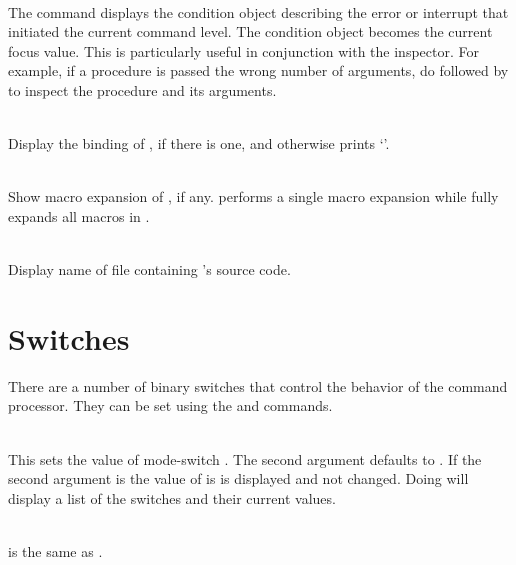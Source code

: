 \begin{description}
\item {}\\
    The  command displays the condition object
    describing the error or interrupt that initiated the current
    command level.  The condition object becomes the current focus
    value.  This is particularly useful in conjunction with
    the inspector.  For example, if a procedure is passed the wrong number of
    arguments, do  followed by
      to inspect the
    procedure and its arguments.

\item {}\\
    Display the binding of , if there is one, and otherwise
    prints `'.
 
\item {}
\T\vspace{-1em}
\item {}\\
    Show macro expansion of , if any.
     performs a single macro expansion while
     fully expands all macros in .

\item {}\\
    Display name of file containing 's source code.
\end{description}

\section{Switches}

There are a number of binary switches that control the behavior of the
 command processor.
They can be set using the  and  commands.

\begin{description}
\item {}\\
    This sets the value of mode-switch .
    The second argument defaults to .
    If the second argument is  the value of  is
    is displayed and not changed.
    Doing  will display a list of the switches and
    their current values.

\item {}\\
     is the same as
    .
\end{description}

